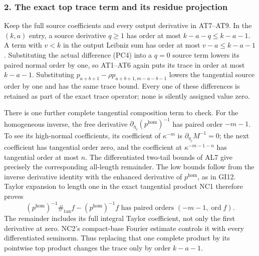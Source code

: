 \documentclass[
  11pt,
]{article}
\begin{document}
\subsubsection{2. The exact top trace term and its residue
projection}\label{pc-cauchy-residue}

Keep the full source coefficients and every output derivative in
AT7--AT9. In the \((k,a)\) entry, a source derivative \(q\geq1\) has
order at most \(k-a-q\leq k-a-1\). A term with \(v<k\) in the output
Leibniz sum has order at most \(v-a\leq k-a-1\). Substituting the actual
difference (PC4) into a \(q=0\) source term lowers its paired normal
order by one, so AT1--AT6 again puts its trace in order at most
\(k-a-1\). Substituting \(p_{a+b+1}-\rho p_{a+b+1,m-a-b-1}\) lowers the
tangential source order by one and has the same trace bound. Every one
of these differences is retained as part of the exact trace operator;
none is silently assigned value zero.

There is one further complete tangential composition term to check. For
the homogeneous inverse, the free derivative
\(\partial_{\eta_\ell}(p^{\mathrm{hom}})^{-1}\) has paired order
\(-m-1\). To see its high-normal coefficients, its coefficient of
\(\kappa^{-m}\) is \(\partial_{\eta_\ell}M^{-1}=0\); the next
coefficient has tangential order zero, and the coefficient at
\(\kappa^{-m-1-n}\) has tangential order at most \(n\). The
differentiated two-tail bounds of AL7 give precisely the corresponding
all-length remainder. The low bounds follow from the inverse derivative
identity with the enhanced derivative of \(p^{\mathrm{hom}}\), as in
GI12. Taylor expansion to length one in the exact tangential product NC1
therefore proves \[
 (p^{\mathrm{hom}})^{-1}\#_{\mathrm{tan}} f
              -(p^{\mathrm{hom}})^{-1}f
 \text{ has paired orders }(-m-1,\operatorname{ord}f).
 \tag{PC5}
\] The remainder includes its full integral Taylor coefficient, not only
the first derivative at zero. NC2's compact-base Fourier estimate
controls it with every differentiated seminorm. Thus replacing that one
complete product by its pointwise top product changes the trace only by
order \(k-a-1\).
\end{document}
